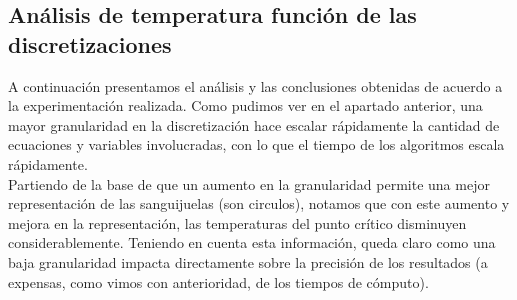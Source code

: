 \subsection{An\'alisis de temperatura funci\'on de las discretizaciones}
A continuaci\'on presentamos el an\'alisis y las conclusiones obtenidas de acuerdo a la experimentaci\'on realizada.
Como pudimos ver en el apartado anterior, una mayor granularidad en la discretizaci\'on hace escalar r\'apidamente la cantidad de ecuaciones y variables involucradas, con lo que el tiempo de los algoritmos escala r\'apidamente. 
\\
Partiendo de la base de que un aumento en la granularidad permite una mejor representaci\'on de las sanguijuelas (son circulos), notamos que con este aumento y mejora en la representaci\'on, las temperaturas del punto cr\'itico disminuyen considerablemente. Teniendo en cuenta esta informaci\'on, queda claro como una baja granularidad impacta directamente sobre la precisi\'on de los resultados (a expensas, como vimos con anterioridad, de los tiempos de c\'omputo).
